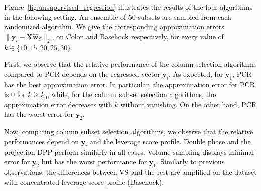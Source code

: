 \documentclass[twoside,11pt]{book}
\newcommand{\rev}[1]{\textcolor{black}{#1}}
\numberwithin{theorem}{chapter}
\numberwithin{definition}{chapter}
\numberwithin{proposition}{chapter}
\numberwithin{corollary}{chapter}
\numberwithin{example}{chapter}
\numberwithin{lemma}{chapter}
\numberwithin{assumption}{chapter}
\numberwithin{equation}{chapter}
\numberwithin{figure}{chapter}
\DeclareMathOperator{\Span}{\mathrm{Span}}
\begin{document}


\rev{Figure}~\ref{fig:unsupervised_regression} \rev{illustrates the results of the four algorithms in the following setting. An ensemble of 50 subsets are sampled from each randomized algorithm. We give the corresponding approximation errors} $\|\mathbf{y}_{i} - \bm{X}\hat{\bm{w}}_S\|_{2}$, \rev{on Colon and Basehock respectively, for every value of $k \in \{10,15,20,25,30\}$}.

\rev{First, we observe that the relative performance of the column selection algorithms compared to PCR depends on the regressed vector $\mathbf{y}_{i}$. As expected, for $\mathbf{y}_{1}$, PCR has the best approximation error. In particular, the approximation error for PCR is $0$ for $k \geq k_{0}$, while, for the column subset selection algorithms, the approximation error decreases with $k$ without vanishing. On the other hand, PCR has the worst error for $\mathbf{y}_{2}$.
}

\rev{
Now, comparing column subset selection algorithms, we observe that the relative performances depend on $\mathbf{y}_{i}$ and the leverage score profile. Double phase and the projection DPP perform similarly in all cases. \rev{Volume sampling displays minimal error for $\mathbf{y}_{2}$ but has the worst performance for $\mathbf{y}_{1}$. Similarly to previous observations, } the differences between VS and the rest are amplified on the dataset with concentrated leverage score profile (Basehock).
}
\end{document}
